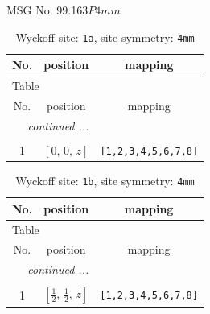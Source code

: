 \documentclass[fleqn,8pt]{jsarticle}
\begin{document}
\setcounter{MaxMatrixCols}{32}

\renewcommand{\tablename}{Table~}
\renewcommand{\figurename}{Figure~}
\begin{center}
\LARGE
MSG No. 99.163\quad$P4mm$
\end{center}
\renewcommand{\arraystretch}{1.2}
\begin{longtable}{ccc}
\caption{Wyckoff site: {\tt 1a}, site symmetry: {\tt 4mm}}
 \\
 \hline \hline
No. & position & mapping \\ \hline \endfirsthead

\multicolumn{2}{l}{\tablename\ \thetable{}} \\
 \hline \hline
No. & position & mapping \\ \hline \endhead

 \hline \hline
\multicolumn{2}{r}{\footnotesize\it continued ...} \\ \endfoot

 \hline \hline
\multicolumn{2}{r}{} \\ \endlastfoot

1 & $\left[ 0,\, 0,\, z \right]$ & {\tt [1,2,3,4,5,6,7,8]} \\
\end{longtable}
\renewcommand{\arraystretch}{1.2}
\begin{longtable}{ccc}
\caption{Wyckoff site: {\tt 1b}, site symmetry: {\tt 4mm}}
 \\
 \hline \hline
No. & position & mapping \\ \hline \endfirsthead

\multicolumn{2}{l}{\tablename\ \thetable{}} \\
 \hline \hline
No. & position & mapping \\ \hline \endhead

 \hline \hline
\multicolumn{2}{r}{\footnotesize\it continued ...} \\ \endfoot

 \hline \hline
\multicolumn{2}{r}{} \\ \endlastfoot

1 & $\left[ \frac{1}{2},\, \frac{1}{2},\, z \right]$ & {\tt [1,2,3,4,5,6,7,8]} \\
\end{longtable}
\renewcommand{\arraystretch}{1.2}
\end{document}
